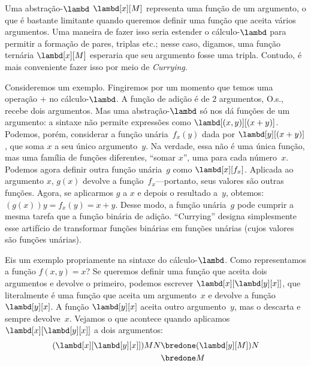 \documentclass[../../../include/open-logic-section]{subfiles}
\begin{document}

Uma abstração-$\lambd$ $\lambd[x][M]$ representa uma função de um
argumento, o que é bastante limitante quando queremos definir uma função que
aceita vários argumentos. Uma maneira de fazer isso seria estender o
cálculo-$\lambd$ para permitir a formação de pares, triplas etc.; nesse
caso, digamos, uma função ternária $\lambd[x][M]$ esperaria que seu argumento
fosse uma tripla. Contudo, é mais conveniente fazer isso por meio de
\emph{Currying}.

Consideremos um exemplo. Fingiremos por um momento que temos uma operação
$+$ no cálculo-$\lambd$. A função de adição é de $2$ argumentos, O.s.\@, recebe dois
argumentos. Mas uma abstração-$\lambd$ só nos dá funções de um argumento: a
sintaxe não permite expressões como $\lambd[(x,y)][(x+y)]$. Podemos, porém,
considerar a função unária~$f_x(y)$ dada por $\lambd[y][(x+y)]$, que soma
$x$ a seu único argumento~$y$. Na verdade, essa não é uma única função, mas
uma família de funções diferentes, ``somar $x$'', uma para cada número~$x$.
Podemos agora definir outra função unária~$g$ como $\lambd[x][f_x]$.
Aplicada ao argumento $x$, $g(x)$ devolve a função~$f_x$---portanto, seus
valores são outras funções. Agora, se aplicarmos $g$ a $x$ e depois o
resultado a~$y$, obtemos: $(g(x))y = f_x(y) = x+y$. Desse modo, a função
unária~$g$ pode cumprir a mesma tarefa que a função binária de adição.
``Currying'' designa simplesmente esse artifício de transformar funções
binárias em funções unárias (cujos valores são funções unárias).

Eis um exemplo propriamente na sintaxe do cálculo-$\lambd$. Como
representamos a função $f(x,y) = x$? Se queremos definir uma função que
aceita dois argumentos e devolve o primeiro, podemos escrever
$\lambd[x][\lambd[y][x]]$, que literalmente é uma função que aceita um
argumento~$x$ e devolve a função~$\lambd[y][x]$. A função $\lambd[y][x]$
aceita outro argumento~$y$, mas o descarta e sempre devolve~$x$. Vejamos o
que acontece quando aplicamos $\lambd[x][\lambd[y][x]]$ a dois argumentos:
\begin{align*}
  (\lambd[x][\lambd[y][x]])MN 
  \bredone & (\lambd[y][M])N \\
  \bredone & M
\end{align*}
\end{document}
